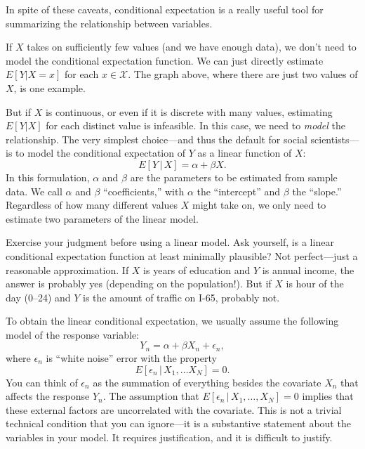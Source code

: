 \documentclass[
  12pt,
  oneside,openany]{book}
\begin{document}
In spite of these caveats, conditional expectation is a really useful tool for summarizing the relationship between variables.

If \(X\) takes on sufficiently few values (and we have enough data), we don't need to model the conditional expectation function. We can just directly estimate \(E[Y | X = x]\) for each \(x \in \mathcal{X}\). The graph above, where there are just two values of \(X\), is one example.

But if \(X\) is continuous, or even if it is discrete with many values, estimating \(E[Y | X]\) for each distinct value is infeasible. In this case, we need to \emph{model} the relationship. The very simplest choice---and thus the default for social scientists---is to model the conditional expectation of \(Y\) as a linear function of \(X\):
\begin{equation}
E[Y \,|\, X] = \alpha + \beta X.
\end{equation}
In this formulation, \(\alpha\) and \(\beta\) are the parameters to be estimated from sample data. We call \(\alpha\) and \(\beta\) ``coefficients,'' with \(\alpha\) the ``intercept'' and \(\beta\) the ``slope.'' Regardless of how many different values \(X\) might take on, we only need to estimate two parameters of the linear model.

Exercise your judgment before using a linear model. Ask yourself, is a linear conditional expectation function at least minimally plausible? Not perfect---just a reasonable approximation. If \(X\) is years of education and \(Y\) is annual income, the answer is probably yes (depending on the population!). But if \(X\) is hour of the day (0--24) and \(Y\) is the amount of traffic on I-65, probably not.

To obtain the linear conditional expectation, we usually assume the following model of the response variable:
\begin{equation}
Y_n = \alpha + \beta X_n + \epsilon_n,
\end{equation}
where \(\epsilon_n\) is ``white noise'' error with the property
\begin{equation}
E[\epsilon_n \,|\, X_1, \ldots X_N] = 0.
\end{equation}
You can think of \(\epsilon_n\) as the summation of everything besides the covariate \(X_n\) that affects the response \(Y_n\). The assumption that \(E[\epsilon_n \,|\, X_1, \ldots, X_N] = 0\) implies that these external factors are uncorrelated with the covariate. This is not a trivial technical condition that you can ignore---it is a substantive statement about the variables in your model. It requires justification, and it is difficult to justify.
\end{document}
